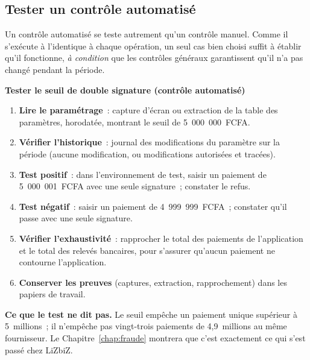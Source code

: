 \subsection{Tester un contrôle automatisé}

Un contrôle automatisé se teste autrement qu'un contrôle manuel. Comme il
s'exécute à l'identique à chaque opération, un seul cas bien choisi suffit
à établir qu'il fonctionne, \emph{à condition} que les contrôles généraux
garantissent qu'il n'a pas changé pendant la période.

\begin{boxprocedure}
\textbf{Tester le seuil de double signature (contrôle automatisé)}
\begin{enumerate}
    \item \textbf{Lire le paramétrage}~: capture d'écran ou extraction de
          la table des paramètres, horodatée, montrant le seuil de
          5~000~000~FCFA.
    \item \textbf{Vérifier l'historique}~: journal des modifications du
          paramètre sur la période (aucune modification, ou modifications
          autorisées et tracées).
    \item \textbf{Test positif}~: dans l'environnement de test, saisir un
          paiement de 5~000~001~FCFA avec une seule signature~; constater le
          refus.
    \item \textbf{Test négatif}~: saisir un paiement de 4~999~999~FCFA~;
          constater qu'il passe avec une seule signature.
    \item \textbf{Vérifier l'exhaustivité}~: rapprocher le total des
          paiements de l'application et le total des relevés bancaires, pour
          s'assurer qu'aucun paiement ne contourne l'application.
    \item \textbf{Conserver les preuves} (captures, extraction, rapprochement)
          dans les papiers de travail.
\end{enumerate}
\end{boxprocedure}

\begin{boxinfo}
\textbf{Ce que le test ne dit pas.} Le seuil empêche un paiement unique
supérieur à 5~millions~; il n'empêche pas vingt-trois paiements de
4,9~millions au même fournisseur. Le Chapitre~\ref{chap:fraude} montrera
que c'est exactement ce qui s'est passé chez LiZbiZ.
\end{boxinfo}

